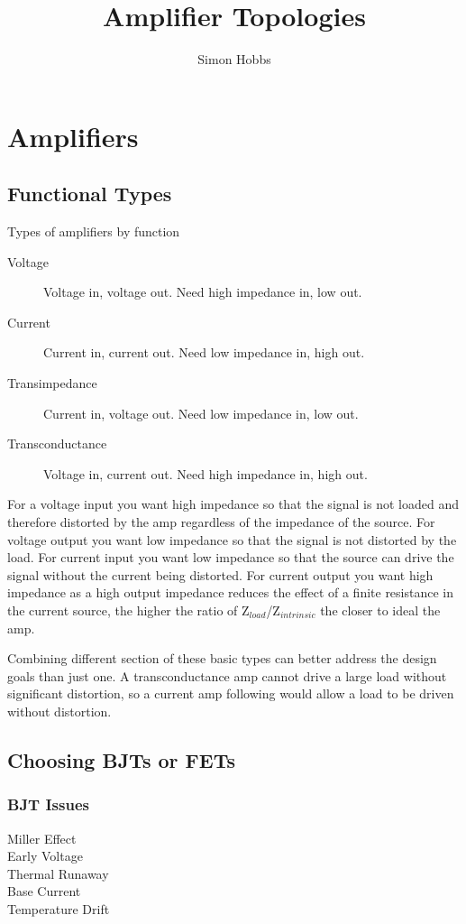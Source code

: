 \documentclass{report}
\title{Amplifier Topologies}
\author{Simon Hobbs}
\begin{document}
\maketitle

\chapter{Amplifiers}

\section{Functional Types}
\label{sec:ampTypes}
\begin{table}[h!]
    \caption{Types of amplifiers by function}
\begin{description}
    \item[Voltage]
        Voltage in, voltage out. Need high impedance in, low out.
    \item[Current]
        Current in, current out. Need low impedance in, high out.
    \item[Transimpedance]
        Current in, voltage out. Need low impedance in, low out.
    \item[Transconductance]
        Voltage in, current out. Need high impedance in, high out.
\end{description}
\end{table}
For a voltage input you want high impedance so that the signal is not loaded and therefore distorted by the amp regardless of the
impedance of the source.
For voltage output you want low impedance so that the signal is not distorted by the load.
For current input you want low impedance so that the source can drive the signal without the current being distorted.
For current output you want high impedance as a high output impedance reduces the effect of a finite resistance in the 
current source, the higher the ratio of Z$_{load}$/Z$_{intrinsic}$ the closer to ideal the amp.

Combining different section of these basic types can better address the design goals than just one.
A transconductance amp cannot drive a large load without significant distortion, so a current amp following would
allow a load to be driven without distortion.

\section{Choosing BJTs or FETs}
\subsection{BJT Issues}
\begin{description}
    \item[Miller Effect]
    \item[Early Voltage]
    \item[Thermal Runaway]
    \item[Base Current]
    \item[Temperature Drift]
\end{description}
\end{document}
